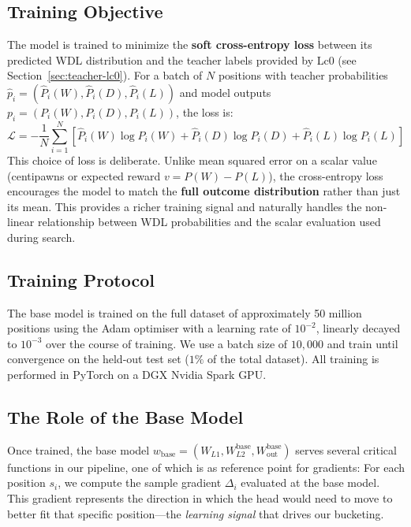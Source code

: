 \subsection{Training Objective}\label{sec:method-loss}

The model is trained to minimize the \textbf{soft cross-entropy loss} between its predicted WDL distribution and the teacher labels provided by Lc0 (see Section~\ref{sec:teacher-lc0}). For a batch of \(N\) positions with teacher probabilities \(\hat{p}_i = (\hat{P}_i(W), \hat{P}_i(D), \hat{P}_i(L))\) and model outputs \(p_i = (P_i(W), P_i(D), P_i(L))\), the loss is:
\[
\mathcal{L} = -\frac{1}{N} \sum_{i=1}^N \left[ \hat{P}_i(W) \log P_i(W) + \hat{P}_i(D) \log P_i(D) + \hat{P}_i(L) \log P_i(L) \right]
\]
This choice of loss is deliberate. Unlike mean squared error on a scalar value (centipawns or expected reward \(v = P(W) - P(L)\)), the cross-entropy loss encourages the model to match the \textbf{full outcome distribution} rather than just its mean. This provides a richer training signal and naturally handles the non-linear relationship between WDL probabilities and the scalar evaluation used during search.

\subsection{Training Protocol}\label{sec:method-protocol}

The base model is trained on the full dataset of approximately 50 million positions using the Adam optimiser with a learning rate of \(10^{-2}\), linearly decayed to \(10^{-3}\) over the course of training. We use a batch size of \(10{,}000\) and train until convergence on the held-out test set (\(1\%\) of the total dataset). All training is performed in PyTorch on a DGX Nvidia Spark GPU.

\subsection{The Role of the Base Model}\label{sec:base-role}

Once trained, the base model \(w_{\mathrm{base}} = (W_{L1}, W_{L2}^{\mathrm{base}}, W_{\mathrm{out}}^{\mathrm{base}})\) serves several critical functions in our pipeline, one of which is as reference point for gradients: For each position \(s_i\), we compute the sample gradient \(\Delta_i\) evaluated at the base model. This gradient represents the direction in which the head would need to move to better fit that specific position---the \emph{learning signal} that drives our bucketing.

